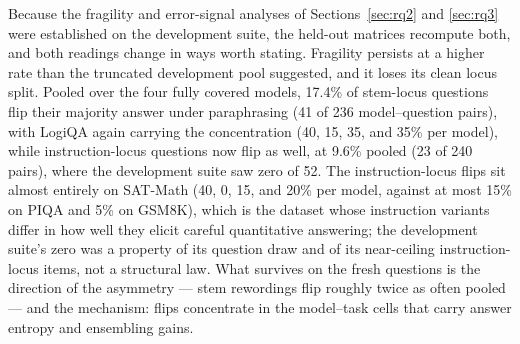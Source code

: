 Because the fragility and error-signal analyses of Sections~\ref{sec:rq2} and \ref{sec:rq3} were established on the development suite, the held-out matrices recompute both, and both readings change in ways worth stating. Fragility persists at a higher rate than the truncated development pool suggested, and it loses its clean locus split. Pooled over the four fully covered models, 17.4\% of stem-locus questions flip their majority answer under paraphrasing (41 of 236 model--question pairs), with LogiQA again carrying the concentration (40, 15, 35, and 35\% per model), while instruction-locus questions now flip as well, at 9.6\% pooled (23 of 240 pairs), where the development suite saw zero of 52. The instruction-locus flips sit almost entirely on SAT-Math (40, 0, 15, and 20\% per model, against at most 15\% on PIQA and 5\% on GSM8K), which is the dataset whose instruction variants differ in how well they elicit careful quantitative answering; the development suite's zero was a property of its question draw and of its near-ceiling instruction-locus items, not a structural law. What survives on the fresh questions is the direction of the asymmetry --- stem rewordings flip roughly twice as often pooled --- and the mechanism: flips concentrate in the model--task cells that carry answer entropy and ensembling gains.

\begin{table}[tbp]
\centering
\footnotesize
\caption{Held-out error-signal analysis. Reference errors are those of the COMB-12 ensemble; detectors are reversed agreement scores ($c_S$ over the six canonical samples, $c_P$ over the six paraphrase first decodes, Both their summed disagreement), reported as AUROC with question-level bootstrap 95\% intervals (cluster bootstrap over questions for the pooled row); every fully covered model carries twelve to twenty-one reference errors, so no row is descriptive-only. Flagged counts the reference errors on which the given source shows any dissent. $^{\S}$Qwen3.7-Flash partial replication (60 of 119 questions) with the self-preference caveat of Section~\ref{sec:setup}; excluded from the pooled row.}
\label{tab:uncertexp}

\end{table}

